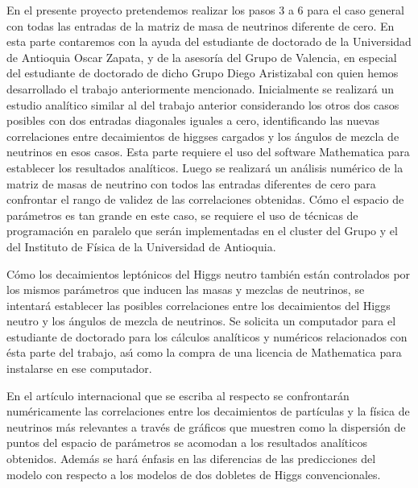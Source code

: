 En el presente proyecto pretendemos realizar los pasos 3 a 6 para el
caso general con todas las entradas de la matriz de masa de neutrinos
diferente de cero. En esta parte contaremos con la ayuda del
estudiante de doctorado de la Universidad de Antioquia Oscar Zapata, y
de la asesoría del Grupo de Valencia, en especial del estudiante de
doctorado de dicho Grupo Diego Aristizabal con quien hemos
desarrollado el trabajo anteriormente mencionado. Inicialmente se
realizará un estudio analítico similar al del trabajo anterior
considerando los otros dos casos posibles con dos entradas diagonales
iguales a cero, identificando las nuevas correlaciones entre
decaimientos de higgses cargados y los ángulos de mezcla de neutrinos
en esos casos. Esta parte requiere el uso del software Mathematica
para establecer los resultados analíticos. Luego se realizará un
análisis numérico de la matriz de masas de neutrino con todos las
entradas diferentes de cero para confrontar el rango de validez de las
correlaciones obtenidas. Cómo el espacio de parámetros es tan grande
en este caso, se requiere el uso de técnicas de programación en
paralelo que serán implementadas en el cluster del Grupo y el del
Instituto de Física de la Universidad de Antioquia.

Cómo los decaimientos leptónicos del Higgs neutro también están
controlados por los mismos parámetros que inducen las masas y mezclas
de neutrinos, se intentará establecer las posibles correlaciones entre
los decaimientos del Higgs neutro y los ángulos de mezcla de
neutrinos. Se solicita un computador para el estudiante de doctorado
para los cálculos analíticos y numéricos relacionados con ésta parte
del trabajo, as\'\i{} como la compra de una licencia de Mathematica para
instalarse en ese computador.

En el artículo internacional que se escriba al respecto se
confrontarán numéricamente las correlaciones entre los decaimientos de
partículas y la física de neutrinos más relevantes a través de
gráficos que muestren como la dispersión de puntos del espacio de
parámetros se acomodan a los resultados analíticos obtenidos. Además
se hará énfasis en las diferencias de las predicciones del modelo con
respecto a los modelos de dos dobletes de Higgs convencionales.

